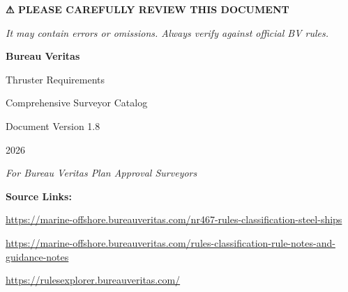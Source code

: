 \documentclass[11pt,a4paper]{report}
\begin{document}
\vspace{1cm}

\begin{center}
\textbf{⚠ PLEASE CAREFULLY REVIEW THIS DOCUMENT}

\textit{It may contain errors or omissions. Always verify against official BV rules.}
\end{center}

\newpage

\thispagestyle{empty}
\vspace*{\fill}
\begin{center}
{\Huge\bfseries\color{bvblue} Bureau Veritas}

\vspace{1cm}

{\Large Thruster Requirements}

{\Large Comprehensive Surveyor Catalog}

\vspace{2cm}

{\large Document Version 1.8}

{\large 2026}

\vspace{2cm}

\textit{For Bureau Veritas Plan Approval Surveyors}

\vspace{1cm}

\textbf{Source Links:}

\small
\url{https://marine-offshore.bureauveritas.com/nr467-rules-classification-steel-ships}

\url{https://marine-offshore.bureauveritas.com/rules-classification-rule-notes-and-guidance-notes}

\url{https://rulesexplorer.bureauveritas.com/}

\end{center}
\vspace*{\fill}
\end{document}
